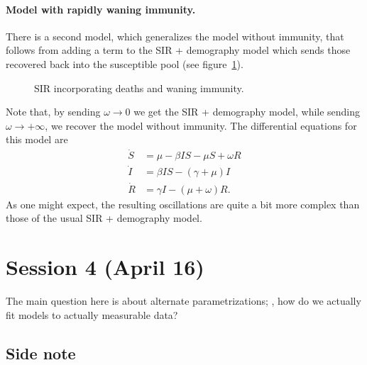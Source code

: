 \documentclass[12pt]{article}
\begin{document}
\paragraph{Model with rapidly waning immunity.} There is a second model, which generalizes the model without immunity, that follows from adding a term to the SIR + demography model which sends those recovered back into the susceptible pool (see figure~\ref{fig:sir-immunity}).
\begin{figure}[ht!]
\centering
{}
\caption{SIR incorporating deaths and waning immunity.}
\label{fig:sir-immunity}
\end{figure}
Note that, by sending $\omega \to 0$ we get the SIR + demography model, while sending $\omega \to +\infty$, we recover the model without immunity. The differential equations for this model are
\[
\begin{aligned}
	\dot S &= \mu - \beta IS - \mu S + \omega R\\
	\dot I &= \beta IS - (\gamma + \mu) I\\
	\dot R &= \gamma I - (\mu + \omega) R.
\end{aligned}
\]
As one might expect, the resulting oscillations are quite a bit more complex than those of the usual SIR + demography model.

\section{Session 4 (April 16)}
The main question here is about alternate parametrizations; \ie, how do we actually fit models to actually measurable data?

\subsection{Side note}
\end{document}
